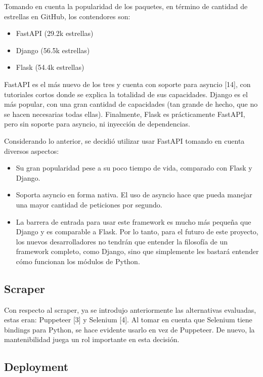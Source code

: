 Tomando en cuenta la popularidad de los paquetes, en término de cantidad de
estrellas en GitHub, los contendores son:

\begin{itemize}
    \item FastAPI (29.2k estrellas)
    \item Django (56.5k estrellas)
    \item Flask (54.4k estrellas)
\end{itemize}

FastAPI es el más nuevo de los tres y cuenta con soporte para asyncio [14], con
tutoriales cortos donde se explica la totalidad de sus capacidades. Django es el
más popular, con una gran cantidad de capacidades (tan grande de hecho, que no
se hacen necesarias todas ellas). Finalmente, Flask es prácticamente FastAPI,
pero sin soporte para asyncio, ni inyección de dependencias.

Considerando lo anterior, se decidió utilizar usar FastAPI tomando en cuenta
diversos aspectos:

\begin{itemize}
    \item Su gran popularidad pese a su poco tiempo de vida, comparado con Flask
    y Django.
    \item Soporta asyncio en forma nativa. El uso de asyncio hace que pueda
    manejar una mayor cantidad de peticiones por segundo.
    \item La barrera de entrada para usar este framework es mucho más pequeña
    que Django y es comparable a Flask. Por lo tanto, para el futuro de este
    proyecto, los nuevos desarrolladores no tendrán que entender la filosofía de
    un framework completo, como Django, sino que simplemente les bastará
    entender cómo funcionan los módulos de Python.
\end{itemize}

\subsection{Scraper}

Con respecto al scraper, ya se introdujo anteriormente las alternativas
evaluadas, estas eran: Puppeteer [3] y Selenium [4]. Al tomar en cuenta que
Selenium tiene bindings para Python, se hace evidente usarlo en vez de
Puppeteer. De nuevo, la mantenibilidad juega un rol importante en esta decisión.

\subsection{Deployment}

